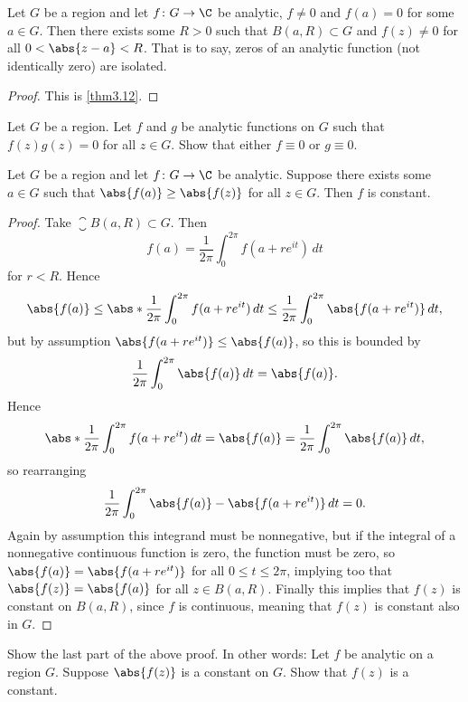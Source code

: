 \begin{corollary}\label{cor3.15}
	Let $G$ be a region and let $f \colon G \to \C$ be analytic, $f \neq 0$ and $f(a) = 0$ for some $a \in G$.
	Then there exists some $R > 0$ such that $B(a, R) \subset G$ and $f(z) \neq 0$ for all $0 < \abs{z - a} < R$.
	That is to say, zeros of an analytic function (not identically zero) are isolated.
\end{corollary}

\begin{proof}
	This is \autoref{thm3.12}.
\end{proof}

\begin{exercise}\label{ex:zerodivs}
	Let $G$ be a region.
	Let $f$ and $g$ be analytic functions on $G$ such that $f(z) g(z) = 0$ for all $z \in G$.
	Show that either $f \equiv 0$ or $g \equiv 0$.
\end{exercise}

\begin{theorem}\label{thm3.16}
	Let $G$ be a region and let $f \colon G \to \C$ be analytic.
	Suppose there exists some $a \in G$ such that $\abs{f(a)} \geq \abs{f(z)}$ for all $z \in G$.
	Then $f$ is constant.
\end{theorem}

\begin{proof}
	Take $\closure{B(a, R)} \subset G$.
	Then
	\[
		f(a) = \frac{1}{2 \pi} \int_0^{2 \pi} f(a + r e^{i t}) \, d t
	\]
	for $r < R$.
	Hence
	\[
		\abs{f(a)} \leq \abs*{\frac{1}{2 \pi} \int_0^{2 \pi} f(a + r e^{i t}) \, d t} \leq \frac{1}{2 \pi} \int_0^{2 \pi} \abs{f(a + r e^{i t})} \, d t,
	\]
	but by assumption $\abs{f(a + r e^{i t})} \leq \abs{f(a)}$, so this is bounded by
	\[
		\frac{1}{2 \pi} \int_0^{2 \pi} \abs{f(a)} \, d t = \abs{f(a)}.
	\]
	Hence
	\[
		\abs*{\frac{1}{2 \pi} \int_0^{2 \pi} f(a + r e^{i t}) \, d t} = \abs{f(a)} = \frac{1}{2 \pi} \int_0^{2 \pi} \abs{f(a)} \, d t,
	\]
	so rearranging
	\[
		\frac{1}{2 \pi} \int_0^{2 \pi} \abs{f(a)} - \abs{f(a + r e^{i t})} \, d t = 0.
	\]
	Again by assumption this integrand must be nonnegative, but if the integral of a nonnegative continuous function is zero, the function must be zero, so $\abs{f(a)} = \abs{f(a + r e^{i t})}$ for all $0 \leq t \leq 2 \pi$, implying too that $\abs{f(z)} = \abs{f(a)}$ for all $z \in B(a, R)$.
	Finally this implies that $f(z)$ is constant on $B(a, R)$, since $f$ is continuous, meaning that $f(z)$ is constant also in $G$.
\end{proof}

\begin{exercise}
	Show the last part of the above proof.
	In other words:
	Let $f$ be analytic on a region $G$.
	Suppose $\abs{f(z)}$ is a constant on $G$.
	Show that $f(z)$ is a constant.
\end{exercise}
